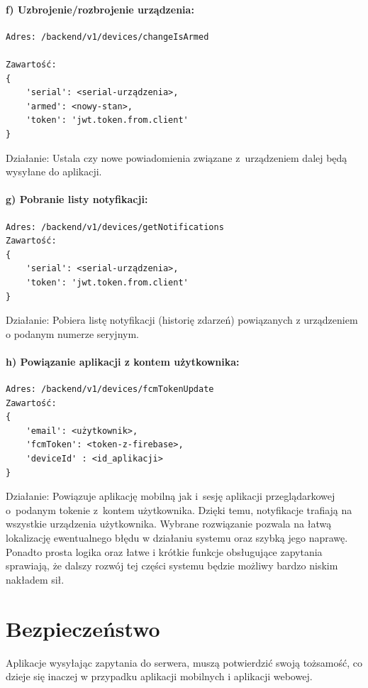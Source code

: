 \paragraph{f) Uzbrojenie/rozbrojenie urządzenia:}
\begin{verbatim}
Adres: /backend/v1/devices/changeIsArmed

Zawartość: 
{
	'serial': <serial-urządzenia>, 
	'armed': <nowy-stan>, 
	'token': 'jwt.token.from.client'
}
\end{verbatim}
Działanie: Ustala czy nowe powiadomienia związane z~urządzeniem dalej będą wysyłane do aplikacji.
\paragraph{g) Pobranie listy notyfikacji:}
\begin{verbatim}
Adres: /backend/v1/devices/getNotifications
Zawartość: 
{
	'serial': <serial-urządzenia>,  
	'token': 'jwt.token.from.client'
}
\end{verbatim}
Działanie: Pobiera listę notyfikacji (historię zdarzeń) powiązanych z urządzeniem o podanym numerze seryjnym.
\paragraph{h) Powiązanie aplikacji z kontem użytkownika:}
\begin{verbatim}
Adres: /backend/v1/devices/fcmTokenUpdate
Zawartość: 
{
	'email': <użytkownik>, 
	'fcmToken': <token-z-firebase>, 
	'deviceId' : <id_aplikacji>
}
\end{verbatim}
Działanie: Powiązuje aplikację mobilną jak i~sesję aplikacji przeglądarkowej o~podanym tokenie z~kontem użytkownika. Dzięki temu, notyfikacje trafiają na wszystkie urządzenia użytkownika.
\newline
\newline
Wybrane rozwiązanie pozwala na łatwą lokalizację ewentualnego błędu w działaniu systemu oraz szybką jego naprawę. Ponadto prosta logika oraz łatwe i krótkie funkcje obsługujące zapytania sprawiają, że dalszy rozwój tej części systemu będzie możliwy bardzo niskim nakładem sił. 

\section{Bezpieczeństwo}

Aplikacje wysyłając zapytania do serwera, muszą potwierdzić swoją tożsamość, co dzieje się inaczej w przypadku aplikacji mobilnych i aplikacji webowej.

